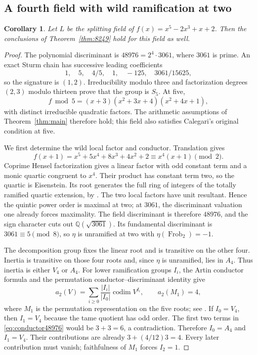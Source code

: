 \documentclass[11pt]{article}
\newtheorem{corollary}[theorem]{Corollary}
\theoremstyle{definition}
\theoremstyle{remark}
\newcommand{\Q}{\mathbb Q}
\numberwithin{equation}{section}
\begin{document}
\subsection{A fourth field with wild ramification at two}

\begin{corollary}\label{cor:48976}
Let $L$ be the splitting field of $f(x)=x^5-2x^3+x+2$. Then the conclusions of Theorem~\ref{thm:8249} hold for this field as well.
\end{corollary}

\begin{proof}
The polynomial discriminant is $48976=2^4\cdot3061$, where $3061$ is prime. An exact Sturm chain has successive leading coefficients
\[
1,\quad5,\quad4/5,\quad1,\quad-125,\quad3061/15625,
\]
so the signature is $(1,2)$. Irreducibility modulo three and factorization degrees $(2,3)$ modulo thirteen prove that the group is $S_5$. At five,
\[
f\bmod5=(x+3)(x^2+3x+4)(x^2+4x+1),
\]
with distinct irreducible quadratic factors. The arithmetic assumptions of Theorem~\ref{thm:main} therefore hold; this field also satisfies Calegari's original condition at five.

We first determine the wild local factor and conductor. Translation gives
\[
f(x+1)=x^5+5x^4+8x^3+4x^2+2\equiv x^4(x+1)\pmod2.
\]
Coprime Hensel factorization gives a linear factor with odd constant term and a monic quartic congruent to $x^4$. Their product has constant term two, so the quartic is Eisenstein. Its root generates the full ring of integers of the totally ramified quartic extension, by \citet[Chapter I, Section 6, Proposition 17 and its corollary]{serrelocal}. The two local factors have unit resultant. Hence the quintic power order is maximal at two; at $3061$, the discriminant valuation one already forces maximality. The field discriminant is therefore $48976$, and the sign character cuts out $\Q(\sqrt{3061})$. Its fundamental discriminant is $3061\equiv5\pmod8$, so $\eta$ is unramified at two with $\eta(\operatorname{Frob}_2)=-1$.

The decomposition group fixes the linear root and is transitive on the other four. Inertia is transitive on those four roots and, since $\eta$ is unramified, lies in $A_4$. Thus inertia is either $V_4$ or $A_4$. For lower ramification groups $I_i$, the Artin conductor formula and the permutation conductor--discriminant identity give
\begin{equation}\label{eq:conductor48976}
a_2(V)=\sum_{i\ge0}\frac{|I_i|}{|I_0|}
\operatorname{codim}V^{I_i},\qquad a_2(M_1)=4,
\end{equation}
where $M_1$ is the permutation representation on the five roots; see \citet[Chapter VI, Section 2, Proposition 2, Corollary $1'$, and Proposition 4]{serrelocal}. If $I_0=V_4$, then $I_1=V_4$ because the tame quotient has odd order. The first two terms in \eqref{eq:conductor48976} would be $3+3=6$, a contradiction. Therefore $I_0=A_4$ and $I_1=V_4$. Their contributions are already $3+(4/12)3=4$. Every later contribution must vanish; faithfulness of $M_1$ forces $I_2=1$.


\end{proof}
\end{document}
